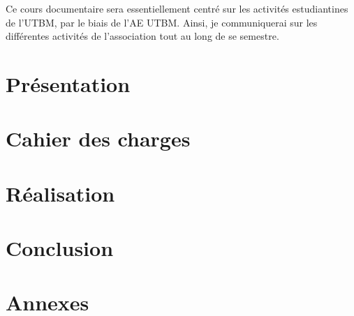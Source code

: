 \documentclass{librairies/lib}
\begin{document}
Ce cours documentaire sera essentiellement centré sur les activités estudiantines de l'\gls{UTBM}, par le biais de l'\gls{AE} \gls{UTBM}.
Ainsi, je communiquerai sur les différentes activités de l'association tout au long de se semestre.

\newpage



\tableofcontents
\newpage



\pagestyle{number}

\section{Présentation}\label{sec:presentation}



\newpage

\section{Cahier des charges}\label{sec:cahier-des-charges}



\newpage

\section{Réalisation}\label{sec:realisation}



\newpage


\section{Conclusion}\label{sec:conclusion}





\newpage
{}

\printglossaries


\newpage




\section*{Annexes}





\newpage

\listoffigures
{}


\newpage

\listoftables
{}

\newpage



\end{document}
